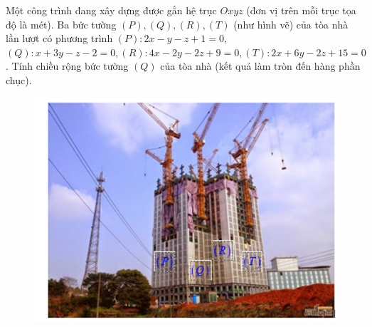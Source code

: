 \begin{ex}%
	Một công trình đang xây dựng được gắn hệ trục $O x y z$ (đơn vị trên mỗi trục tọa độ là mét). Ba bức tường $(P),(Q),(R),(T)$ (như hình vẽ) của tòa nhà lần lượt có phương trình $(P)\colon 2x-y-z+1=0$, $(Q)\colon x+3y-z-2=0,(R)\colon 4x-2y-2 z+9=0,(T)\colon 2x+6y-2z+15=0$. Tính chiều rộng bức tường $(Q)$ của tòa nhà (kết quả làm tròn đến hàng phần chục).
	\begin{figure}[!ht]
		\centering
		\includegraphics[width=0.5\linewidth]{images/h2.png}
	\end{figure}
\end{ex}
